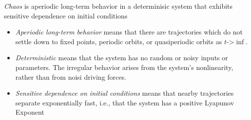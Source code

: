 \emph{Chaos} is aperiodic long-term behavior in a determinisic system that exhibits sensitive dependence on initial conditions \cite{Strogatz14}
\begin{itemize}
\item \emph{Aperiodic long-term behavior} means that there are trajectories which do not settle down to fixed points, periodic orbits, or quasiperiodic orbits as $t$->$\inf$.
\item \emph{Deterministic} means that the system has no random or noisy inputs or parameters. The irregular behavior arises from the system's nonlinearity, rather than from noisi driving forces.
\item \emph{Sensitive dependence on initial conditions} means that nearby trajectories separate exponentially fast, i.e., that the system has a positive Lyapunov Exponent
\end{itemize}